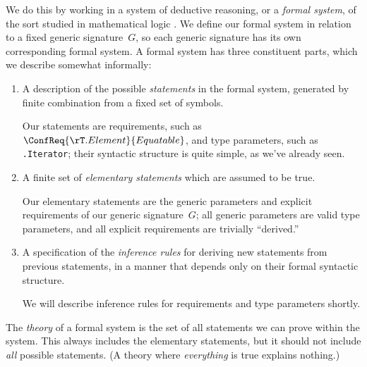 \documentclass[../generics]{subfiles}
\begin{document}
We do this by working in a system of deductive reasoning, or a \emph{formal system}, of the sort studied in mathematical logic \cite{curry}. We define our formal system in relation to a fixed generic signature~$G$, so each generic signature has its own corresponding formal system. A formal system has three constituent parts, which we describe somewhat informally:
\begin{enumerate}
\item A description of the possible \emph{statements} in the formal system, generated by finite combination from a fixed set of symbols.

Our statements are requirements, such as $\ConfReq{\rT.Element}{Equatable}$, and type parameters, such as \texttt{\rU.Iterator}; their syntactic structure is quite simple, as we've already seen.
\item A finite set of \emph{elementary statements} which are assumed to be true.

Our elementary statements are the generic parameters and explicit requirements of our generic signature~$G$; all generic parameters are valid type parameters, and all explicit requirements are trivially ``derived.''

\item A specification of the \emph{inference rules} for deriving new statements from previous statements, in a manner that depends only on their formal syntactic structure.

We will describe inference rules for requirements and type parameters shortly.
\end{enumerate}

The \emph{theory} of a formal system is the set of all statements we can prove within the system. This always includes the elementary statements, but it should not include \emph{all} possible statements. (A theory where \emph{everything} is true explains nothing.)
\end{document}
